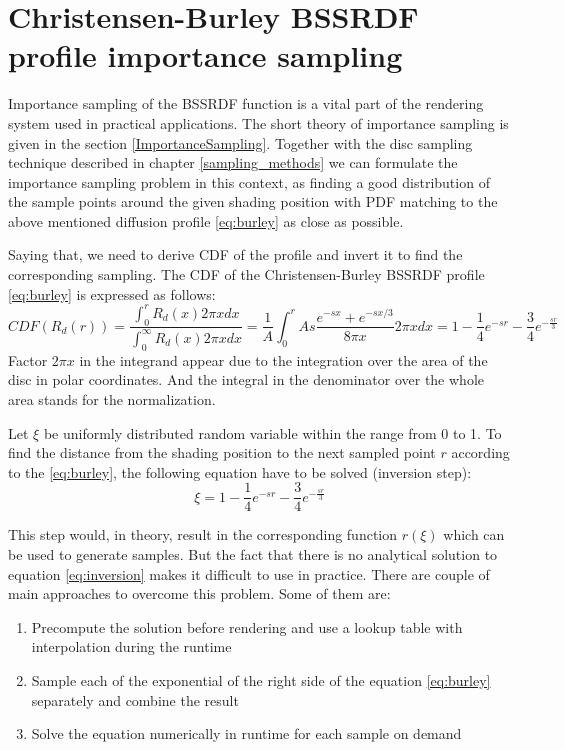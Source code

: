 \section{Christensen-Burley BSSRDF profile importance sampling}
\label{section:burley_importance}

Importance sampling of the BSSRDF function is a vital part of the rendering system used in practical
applications. The short theory of importance sampling is given in the section
\ref{ImportanceSampling}. Together with the disc sampling technique described in chapter
\ref{sampling_methods} we can formulate the importance sampling problem in this context, as finding
a good distribution of the sample points around the given shading position with \gls{PDF} matching
to the above mentioned diffusion profile \ref{eq:burley} as close as possible.

Saying that, we need to derive \gls{CDF} of the profile and invert it to find the corresponding
sampling.
The \gls{CDF} of the Christensen-Burley \gls{BSSRDF} profile \ref{eq:burley} is expressed as
follows:
\[
\label{eq:burley_cdf}
CDF(R_d(r)) = \frac{\int_{0}^{r} R_d(x)2\pi xdx}{\int_{0}^{\infty} R_d(x)2\pi xdx}  = \frac{1}{A}
\int_{0}^{r} As\frac{e^{-sx}+e^{-sx/3}}{8\pi x}2\pi xdx =
1-\frac{1}{4}e^{-sr}-\frac{3}{4}e^{-\frac{sr}{3}} \] Factor $2\pi x$ in the integrand appear due to
the integration over the area of the disc in polar coordinates. And the integral in the denominator
over the whole area stands for the normalization.

Let $\xi$ be uniformly distributed random variable within the range from 0 to 1. To find the
distance from the shading position to the next sampled point $r$ according to the \ref{eq:burley},
the following equation have to be solved (inversion step):
\begin{equation}
\label{eq:inversion}
\xi=1-\frac{1}{4}e^{-sr}-\frac{3}{4}e^{-\frac{sr}{3}}
\end{equation}

This step would, in theory, result in the corresponding function $r(\xi)$ which can be used to
generate samples. But the fact that there is no analytical solution to equation
\ref{eq:inversion} makes it difficult to use in practice.
There are couple of main approaches to overcome this problem. Some of them are:
\begin{enumerate}
  \item Precompute the solution before rendering and use a lookup table with interpolation
  during the runtime
  \item Sample each of the exponential of the right side of the equation \ref{eq:burley}
  separately and combine the result
  \item Solve the equation numerically in runtime for each sample on demand
\end{enumerate}

